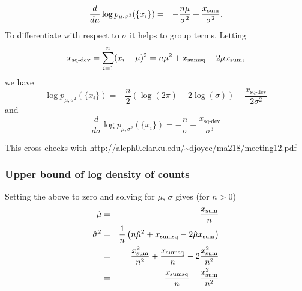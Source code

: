 \documentclass[12pt]{article}
\begin{document}
\begin{eqnarray*}
\frac{d}{d\mu} \log p_{\mu,\sigma^2}(\{x_i\}) & = & -\frac{n\mu}{\sigma^2} + \frac{x_{\textrm{sum}}}{\sigma^2}.
\end{eqnarray*}
To differentiate with respect to $\sigma$ it helps to group terms.  Letting
\newcommand{\deviance}{x_{\textrm{sq-dev}}}
\[ \deviance = \sum_{i=1}^n (x_i - \mu)^2 = n\mu^2 + \xsumsq - 2 \mu \xsum, \]
we have
\[ \log p_{\mu,\sigma^2}(\{x_i\}) = -\frac{n}{2}(\log(2\pi) + 2\log(\sigma))
   - \frac{\deviance}{2\sigma^2} \]
and
\[ \frac{d}{d\sigma} \log p_{\mu,\sigma^2}(\{x_i\}) = -\frac{n}{\sigma} + \frac{\deviance}{\sigma^3} \]

This cross-checks with \url{http://aleph0.clarku.edu/~djoyce/ma218/meeting12.pdf}

\subsubsection{Upper bound of log density of counts}

Setting the above to zero and solving for $\mu$, $\sigma$ gives (for $n > 0$)
\begin{eqnarray*}
 \hat\mu & = & \frac{x_{\textrm{sum}}}{n} \\
 \hat\sigma^2 & = & \frac{1}{n}\left(n\hat\mu^2 + x_{\textrm{sumsq}} -2\hat\mu x_{\textrm{sum}}\right) \\
  & = & \frac{x_{\textrm{sum}}^2}{n^2} + \frac{x_{\textrm{sumsq}}}{n} - 2\frac{x_{\textrm{sum}}^2}{n^2} \\
  & = & \frac{x_{\textrm{sumsq}}}{n} - \frac{x_{\textrm{sum}}^2}{n^2}
\end{eqnarray*}
\end{document}
